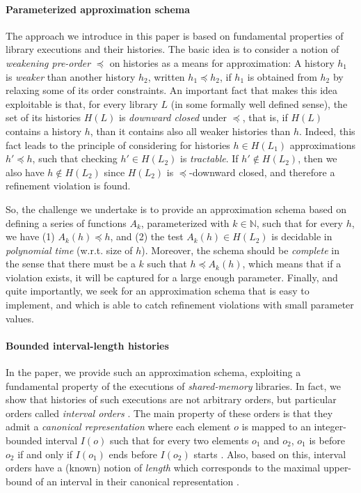\paragraph{Parameterized approximation schema}

The approach we introduce in this paper is based on fundamental properties of
library executions and their histories. The basic idea is to consider a notion
of \emph{weakening pre-order} $\preceq$ on histories as a means for
approximation: A history $h_1$ is \emph{weaker} than another history $h_2$,
written $h_1 \preceq h_2$, if $h_1$ is obtained from $h_2$ by relaxing some of
its order constraints. An important fact that makes this idea exploitable is
that, for every library $L$ (in some formally well defined sense), the set of
its histories $H(L)$ is \emph{downward closed} under $\preceq$, that is, if
$H(L)$ contains a history $h$, than it contains also all weaker histories than
$h$. Indeed, this fact leads to the principle of considering for histories $h
\in H(L_1)$ approximations $h' \preceq h$, such that checking $h' \in H(L_2)$
is \emph{tractable}. If $h' \not\in H(L_2)$, then we also have $h \not\in
H(L_2)$ since $H(L_2)$ is $\preceq$-downward closed, and therefore a refinement
violation is found.

So, the challenge we undertake is to provide an approximation schema based on
defining a series of functions $A_k$, parameterized with $k \in \mathbb{N}$,
such that for every $h$, we have (1) $A_k (h) \preceq h$, and (2) the test
$A_k(h) \in H(L_2)$ is decidable in \emph{polynomial time} (w.r.t. size of $h$).
Moreover, the schema should be \emph{complete} in the sense that there must be a
$k$ such that $h \preceq A_k(h)$, which means that if a violation exists, it
will be captured for a large enough parameter. Finally, and quite importantly,
we seek for an approximation schema that is easy to implement, and which is
able to catch refinement violations with small parameter values.

\paragraph{Bounded interval-length histories}

In the paper, we provide such an approximation schema, exploiting a fundamental
property of the executions of \emph{shared-memory} libraries. In fact, we show
that histories of such executions are not arbitrary orders, but particular
orders called \emph{interval orders} \cite{}. The main property of these orders
is that they admit a \emph{canonical representation} where each element $o$ is
mapped to an integer-bounded interval $I(o)$ such that for every two elements
$o_1$ and $o_2$, $o_1$ is before $o_2$ if and only if $I(o_1)$ ends before
$I(o_2)$ starts \cite{}. Also, based on this, interval orders have a (known)
notion of \emph{length} which corresponds to the maximal upper-bound of an
interval in their canonical representation \cite{}.

